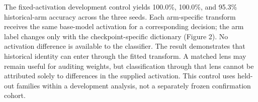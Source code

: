 \documentclass[10pt]{article}
\begin{document}
The fixed-activation development control yields 100.0\%, 100.0\%, and
95.3\% historical-arm accuracy across the three seeds. Each arm-specific
transform receives the same base-model activation for a corresponding
decision; the arm label changes only with the checkpoint-specific
dictionary (Figure 2). No activation difference is available to the
classifier. The result demonstrates that historical identity can enter
through the fitted transform. A matched lens may remain useful for
auditing weights, but classification through that lens cannot be
attributed solely to differences in the supplied activation. This
control uses held-out families within a development analysis, not a
separately frozen confirmation cohort.

\begin{figure}[!tbp]
\centering
\makeatletter
{}
\end{figure}
\end{document}
